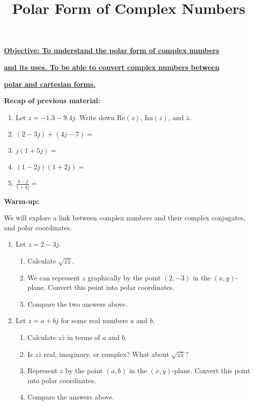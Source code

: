 \documentclass{article}
\begin{document}
\title{Polar Form of Complex Numbers}
\date{}

\maketitle
\thispagestyle{empty}

\Large

\textbf{\underline{Objective: To understand the polar form of complex numbers}}

\textbf{\underline{and its uses. To be able to convert complex numbers between}}

\textbf{\underline{polar and cartesian forms.}}

\vspace{5mm}


{\bf Recap of previous material:}

\vspace{5mm}

\begin{enumerate}
\item Let $z=-1.3-9.4j$. Write down $\mathrm{Re}(z)$, $\mathrm{Im}(z)$, and $\bar{z}$.
\item $(2-3j)+(4j-7)=$
\item $j(1+5j)=$
\item $(1-2j)(1+2j)=$
\item $\frac{4-j}{1+4j}=$
\end{enumerate}


\clearpage

{\bf Warm-up:}

\vspace{5mm}

We will explore a link between complex numbers and their complex conjugates, and polar coordinates.

\begin{enumerate}
\item Let $z=2-3j$.
	\begin{enumerate}
	\item Calculate $\sqrt{z\bar{z}}$.
	\item We can represent $z$ graphically by the point $(2,-3)$ in the $(x,y)$-plane. Convert this point into polar coordinates.
	\item Compare the two answers above.
	\end{enumerate}
\item Let $z=a+bj$ for some real numbers $a$ and $b$.
	\begin{enumerate}
	\item Calculate $z\bar{z}$ in terms of $a$ and $b$.
	\item Is $z\bar{z}$ real, imaginary, or complex? What about $\sqrt{z\bar{z}}$?
	\item Represent $z$ by the point $(a,b)$ in the $(x,y)$-plane. Convert this point into polar coordinates.
	\item Compare the answers above.
	\end{enumerate}
\end{enumerate}
\end{document}
